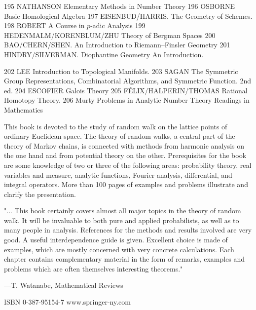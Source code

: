195 NATHANSON Elementary Methods in Number Theory
196 OSBORNE Basic Homological Algebra
197 EISENBUD/HARRIS. The Geometry of Schemes.
198 ROBERT A Course in $p$-adic Analysis
199 HEDENMALM/KORENBLUM/ZHU Theory of Bergman Spaces
200 BAO/CHERN/SHEN. An Introduction to Riemann–Finsler Geometry
201 HINDRY/SILVERMAN. Diophantine Geometry An Introduction.

202 LEE Introduction to Topological Manifolds.
203 SAGAN The Symmetric Group Representations, Combinatorial Algorithms, and Symmetric Function. 2nd ed.
204 ESCOFIER Galois Theory
205 FÉLIX/HALPERIN/THOMAS Rational Homotopy Theory.
206 Murty Problems in Analytic Number Theory
Readings in Mathematics

This book is devoted to the study of random walk on the lattice points of ordinary Euclidean space. The theory of random walks, a central part of the theory of Markov chains, is connected with methods from harmonic analysis on the one hand and from potential theory on the other. Prerequisites for the book are some knowledge of two or three of the following areas: probability theory, real variables and measure, analytic functions, Fourier analysis, differential, and integral operators. More than 100 pages of examples and problems illustrate and clarify the presentation.

"... This book certainly covers almost all major topics in the theory of random walk. It will be invaluable to both pure and applied probabilists, as well as to many people in analysis. References for the methods and results involved are very good. A useful interdependence guide is given. Excellent choice is made of examples, which are mostly concerned with very concrete calculations. Each chapter contains complementary material in the form of remarks, examples and problems which are often themselves interesting theorems."

—T. Watanabe, Mathematical Reviews

ISBN 0-387-95154-7
www.springer-ny.com